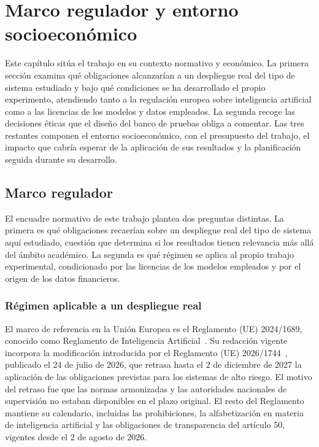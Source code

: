 
\chapter{Marco regulador y entorno socioeconómico}
\label{chap:marco_regulador}

Este capítulo sitúa el trabajo en su contexto normativo y económico. La primera sección examina qué obligaciones alcanzarían a un despliegue real del tipo de sistema estudiado y bajo qué condiciones se ha desarrollado el propio experimento, atendiendo tanto a la regulación europea sobre inteligencia artificial como a las licencias de los modelos y datos empleados. La segunda recoge las decisiones éticas que el diseño del banco de pruebas obliga a comentar. Las tres restantes componen el entorno socioeconómico, con el presupuesto del trabajo, el impacto que cabría esperar de la aplicación de sus resultados y la planificación seguida durante su desarrollo.

\section{Marco regulador}
\label{sec:marco_regulador}

El encuadre normativo de este trabajo plantea dos preguntas distintas. La primera es qué obligaciones recaerían sobre un despliegue real del tipo de sistema aquí estudiado, cuestión que determina si los resultados tienen relevancia más allá del ámbito académico. La segunda es qué régimen se aplica al propio trabajo experimental, condicionado por las licencias de los modelos empleados y por el origen de los datos financieros.

\subsection{Régimen aplicable a un despliegue real}

El marco de referencia en la Unión Europea es el Reglamento (UE) 2024/1689, conocido como Reglamento de Inteligencia Artificial~\cite{ue2024ai_act}. Su redacción vigente incorpora la modificación introducida por el Reglamento (UE) 2026/1744~\cite{ue2026omnibus}, publicado el 24 de julio de 2026, que retrasa hasta el 2 de diciembre de 2027 la aplicación de las obligaciones previstas para los sistemas de alto riesgo. El motivo del retraso fue que las normas armonizadas y las autoridades nacionales de supervisión no estaban disponibles en el plazo original. El resto del Reglamento mantiene su calendario, incluidas las prohibiciones, la alfabetización en materia de inteligencia artificial y las obligaciones de transparencia del artículo 50, vigentes desde el 2 de agosto de 2026.

